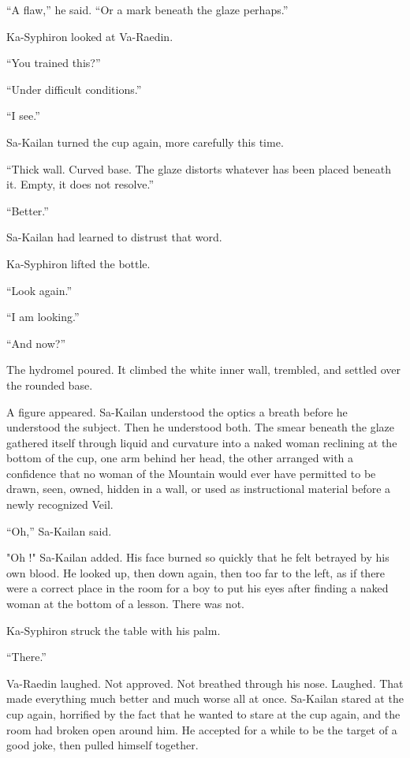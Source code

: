 “A flaw,” he said. “Or a mark beneath the glaze perhaps.”\par
Ka-Syphiron looked at Va-Raedin.\par
“You trained this?”\par
“Under difficult conditions.”\par
“I see.”\par
Sa-Kailan turned the cup again, more carefully this time.\par
“Thick wall. Curved base. The glaze distorts whatever has been placed beneath it. Empty, it does not resolve.”\par
“Better.”\par
Sa-Kailan had learned to distrust that word.\par
Ka-Syphiron lifted the bottle.\par
“Look again.”\par
“I am looking.”\par
“And now?”\par


The hydromel poured. It climbed the white inner wall, trembled, and settled over the rounded base.\par
A figure appeared.
Sa-Kailan understood the optics a breath before he understood the subject.
Then he understood both.
The smear beneath the glaze gathered itself through liquid and curvature into a naked woman reclining at the bottom of the cup, one arm behind her head, the other arranged with a confidence that no woman of the Mountain would ever have permitted to be drawn, seen, owned, hidden in a wall, or used as instructional material before a newly recognized Veil.\par
“Oh,” Sa-Kailan said.\par
"Oh !" Sa-Kailan added.
His face burned so quickly that he felt betrayed by his own blood. 
He looked up, then down again, then too far to the left, as if there were a correct place in the room for a boy to put his eyes after finding a naked woman at the bottom of a lesson.
There was not.\par
Ka-Syphiron struck the table with his palm.\par
“There.”\par

Va-Raedin laughed. Not approved. Not breathed through his nose. Laughed. 
That made everything much better and much worse all at once.
Sa-Kailan stared at the cup again, horrified by the fact that he wanted to stare at the cup again, and the room had broken open around him.
He accepted for a while to be the target of a good joke, then pulled himself together. \par

